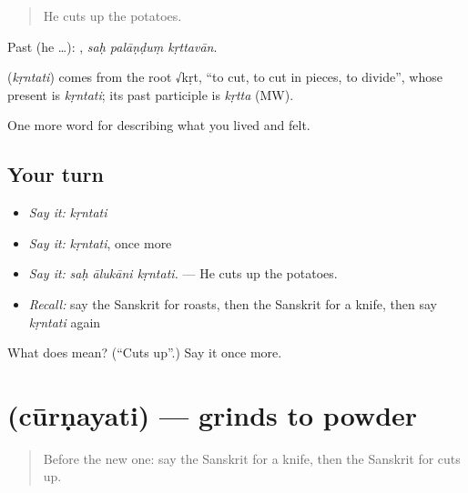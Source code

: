 \begin{quote}
He cuts up the potatoes.
\end{quote}

Past (he …):   , \emph{saḥ palāṇḍuṃ kṛttavān}.

\begin{cousinweb}
\textbf{} (\emph{kṛntati}) comes from the root √kṛt, \textquotedblleft{}to cut, to cut in pieces, to divide\textquotedblright{}, whose present is \emph{kṛntati}; its past participle is \emph{kṛtta} (MW).
\end{cousinweb}

\begin{grammarlens}[title={What you've built}]
One more word for describing what you lived and felt.
\end{grammarlens}

\subsection*{Your turn}
\begin{itemize}
\raggedright
  \item \emph{Say it:} \emph{kṛntati}
  \item \emph{Say it:} \emph{kṛntati}, once more
  \item \emph{Say it:} \emph{saḥ ālukāni kṛntati.} — He cuts up the potatoes.
  \item \emph{Recall:} say the Sanskrit for roasts, then the Sanskrit for a knife, then say \emph{kṛntati} again
\end{itemize}

\begin{tcolorbox}[breakable,colback=teal!4,colframe=teal!35!black,title={Before you move on}]
What does  mean? (\textquotedblleft{}Cuts up\textquotedblright{}.) Say it once more.
\end{tcolorbox}
\section[\texorpdfstring{\sk{चूर्णयति} (cūrṇayati)}{चूर्णयति (cūrṇayati)}]{ (cūrṇayati) — grinds to powder}

\label{lesson:SA-C512-curnayati}



\begin{quote}
Before the new one: say the Sanskrit for a knife, then the Sanskrit for cuts up.
\end{quote}

